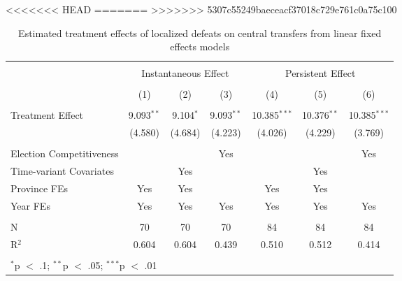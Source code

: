 
<<<<<<< HEAD
=======
>>>>>>> 5307c55249baeceacf37018c729e761c0a75c100
\begin{table}[!htbp] \centering 
  \caption{Estimated treatment effects of localized defeats on central transfers from linear fixed effects models} 
  \label{tab:lfe_main} 
\begin{tabular}{@{\extracolsep{5pt}}lcccccc} 
\\[-1.8ex]\hline 
\hline \\[-1.8ex] 
 & \multicolumn{3}{c}{Instantaneous Effect} & \multicolumn{3}{c}{Persistent Effect} \\ 
\\[-1.8ex] & (1) & (2) & (3) & (4) & (5) & (6)\\ 
\hline \\[-1.8ex] 
 Treatment Effect & 9.093$^{**}$ & 9.104$^{*}$ & 9.093$^{**}$ & 10.385$^{***}$ & 10.376$^{**}$ & 10.385$^{***}$ \\ 
  & (4.580) & (4.684) & (4.223) & (4.026) & (4.229) & (3.769) \\ 
 \hline \\[-1.8ex] 
Election Competitiveness &  &  & Yes &  &  & Yes \\ 
Time-variant Covariates &  & Yes &  &  & Yes &  \\ 
Province FEs & Yes & Yes &  & Yes & Yes &  \\ 
Year FEs & Yes & Yes & Yes & Yes & Yes & Yes \\ 
\hline \\[-1.8ex] 
N & 70 & 70 & 70 & 84 & 84 & 84 \\ 
R$^{2}$ & 0.604 & 0.604 & 0.439 & 0.510 & 0.512 & 0.414 \\ 
\hline 
\hline \\[-1.8ex] 
\multicolumn{7}{l}{$^{*}$p $<$ .1; $^{**}$p $<$ .05; $^{***}$p $<$ .01} \\ 
\end{tabular} 
\end{table} 
